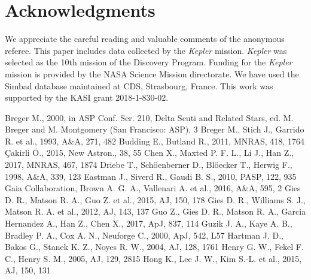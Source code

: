 \documentclass[useAMS,usenatbib,usegraphicx]{mn2e}
\begin{document}
\section*{Acknowledgments}
We appreciate the careful reading and valuable comments of the anonymous referee. This paper includes data collected by 
the {\it Kepler} mission. {\it Kepler} was selected as the 10th mission of the Discovery Program. Funding for the {\it Kepler} 
mission is provided by the NASA Science Mission directorate. We have used the Simbad database maintained at CDS, Strasbourg, 
France. This work was supported by the KASI grant 2018-1-830-02.


\begin{thebibliography}{99}
 Breger M., 2000, in ASP Conf. Ser. 210, Delta Scuti and Related Stars, ed. M. Breger and M. Montgomery (San Francisco: ASP), 3
 Breger M., Stich J., Garrido R. et al., 1993, A\&A, 271, 482
 Budding E., Butland R., 2011, MNRAS, 418, 1764
 \c Cakirli \" O., 2015, New Astron., 38, 55
 Chen X., Maxted P. F. L., Li J., Han Z., 2017, MNRAS, 467, 1874
 Driebe T., Sch\"oenberner D., Bl\"oecker T., Herwig F., 1998, A\&A, 339, 123
 Eastman J., Siverd R., Gaudi B. S., 2010, PASP, 122, 935
 Gaia Collaboration, Brown A. G. A., Vallenari A. et al., 2016, A\&A, 595, 2
 Gies D. R., Matson R. A., Guo Z. et al., 2015, AJ, 150, 178
 Gies D. R., Williams S. J., Matson R. A. et al., 2012, AJ, 143, 137
 Guo Z., Gies D. R., Matson R. A., Garcia Hernandez A., Han Z., Chen X., 2017, ApJ, 837, 114
 Guzik J. A., Kaye A. B., Bradley P. A., Cox A. N., Neuforge C., 2000, ApJ, 542, L57
 Hartman J. D., Bakos G., Stanek K. Z., Noyes R. W., 2004, AJ, 128, 1761
 Henry G. W., Fekel F. C., Henry S. M., 2005, AJ, 129, 2815
 Hong K., Lee J. W., Kim S.-L. et al., 2015, AJ, 150, 131

\end{thebibliography}
\end{document}
